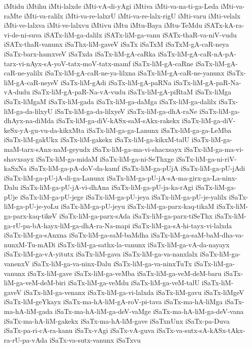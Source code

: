 {iMtidu
iMtihu
iMti-lalxde
iMti-vA-di-yAgi
iMtiva
iMti-va-na-ti-ga-Leda
iMti-va-raMte
iMti-va-ralilx
iMti-va-re-lalxrU
iMti-va-re-lalx-rigU
iMti-varu
iMti-velalx
iMti-ve-lalxva
iMti-ve-lalxvu
iMtivu
iMtu
iMtu-Baya
iMtu-TeMdu
iSATx-kA-ra-vi-de-ni-suva
iSATx-liM-ga-dalilx
iSATx-liM-ga-vanu
iSATx-thaR-va-niV-vudu
iSATx-thaR-vanunx
iSaThx-liM-gaveV
iSaTx
iSaTxM
iSaTxM-gA-caR-neya
iSaTx-barx-hamxveV
iSaTxda
iSaTx-liM-gA-caRka
iSaTx-liM-gA-caR-nA-pA-tarx-vi-nAyx-sA-yoV-tatx-moV-tatx-mamf
iSaTx-liM-gA-caRne
iSaTx-liM-gA-caR-ne-yalilx
iSaTx-liM-gA-caR-ne-ya-lilxna
iSaTx-liM-gA-caR-ne-yanunx
iSaTx-liM-gA-caR-neyeV
iSaTx-liM-gAdi
iSaTx-liM-gA-paRNa
iSaTx-liM-gA-paR-Na-vA-dudu
iSaTx-liM-gA-paR-Na-vA-vudu
iSaTx-liM-gA-piRtaM
iSaTx-liMga
iSaTx-liMgaM
iSaTx-liM-gada
iSaTx-liM-ga-daMga
iSaTx-liM-ga-dalilx
iSaTx-liM-ga-da-lilxyU
iSaTx-liM-ga-da-lilxyeV
iSaTx-liM-ga-dhA-raNe
iSaTx-liM-ga-dhAyx-na-diMda
iSaTx-liM-ga-diV-kASx-saM-sAkx-rakekx
iSaTx-liM-ga-diV-keSx-yA-gu-vu-da-kikxMta
iSaTx-liM-ga-ga-Lanunx
iSaTx-liM-ga-ga-LeMba
iSaTx-liM-gakUkx
iSaTx-liM-gakekx
iSaTx-liM-ga-kikxM-talU
iSaTx-liM-ga-maM-tarx-sAnx-naM-geyudx
iSaTx-liM-ga-ma-vi-shacxsayx
iSaTx-liM-ga-ma-vi-shavxsayx
iSaTx-liM-ga-midaM
iSaTx-liM-ga-ni-SeThxge
iSaTx-liM-ga-ni-riV-kaSxNa
iSaTx-liM-ga-pA-doV-da-kamf
iSaTx-liM-ga-pUjA
iSaTx-liM-ga-pU-jAdi
iSaTx-liM-ga-pU-jA-di-ga-Lanunx
iSaTx-liM-ga-pU-jA-sA-ma-girx-ga-La-ninx-Dalu
iSaTx-liM-ga-pU-jA-vi-dhAna
iSaTx-liM-ga-pU-ja-ka-rAgi
iSaTx-liM-ga-pUje
iSaTx-liM-ga-pU-jege
iSaTx-liM-ga-pU-jeya
iSaTx-liM-ga-pU-je-yalilx
iSaTx-liM-ga-pU-je-yoLu
iSaTx-liM-ga-pU-jeyu
iSaTx-liM-ga-parx-kaq-tikaM
iSaTx-liM-ga-parx-kaq-tikeV
iSaTx-liM-ga-parx-sAda
iSaTx-liM-ga-parx-tiSeThx
iSaTx-liM-ga-rU-pa-bA-hayx-liM-ga-dhA-ra-Na-mapi
iSaTx-liM-ga-sA-hi-tayx-vi-lalxda
iSaTx-liM-ga-sAnxna
iSaTx-liM-ga-saM-baMdha
iSaTx-liM-ga-saM-baM-dha-va-nunxM-Tu-mADi
iSaTx-liM-ga-sathx-la-vanunx
iSaTx-liM-ga-vA-da-nayayx
iSaTx-liM-ga-vA-yitutx
iSaTx-liM-gava
iSaTx-liM-ga-va-nanxlalx
iSaTx-liM-ga-vanenxV
iSaTx-liM-ga-va-ninx-Dalu
iSaTx-liM-ga-va-ninxTuTx
iSaTx-liM-ga-vanunx
iSaTx-liM-gave
iSaTx-liM-ga-veMba
iSaTx-liM-ga-veM-deM-baru
iSaTx-liM-ga-veM-deM-biri
iSaTx-liM-ga-veMdu
iSaTx-liM-ga-veM-talU
iSaTx-liM-gaveV
iSaTx-liM-ga-venanx
iSaTx-liM-ga-vi-lalxda
iSaTx-liM-gavu
iSaTx-liMgeV
iSaTx-liM-geYkayx
iSaTx-ma-hA-liM-gA-roV-pi-tava
iSaTx-ma-hA-liMga
iSaTx-ma-hA-liM-gada
iSaTx-ma-hA-liM-ga-deV-vaMge
iSaTx-ma-hA-liM-ga-deV-vana
iSaTx-ma-hA-liM-gakekx
iSaTx-ma-hA-liM-gave
iSaTxnUnx
iSaTx-pa-Duva
iSaTx-pa-ri-cA-ra-kanu
iSaTx-vAgi
iSaTx-vA-guva
iSaTx-va-sutx-sA-kASx-tAkx-ra-rU-pa-vAda
iSaTx-va-sutx-vanunx
iSaTxvu
}
